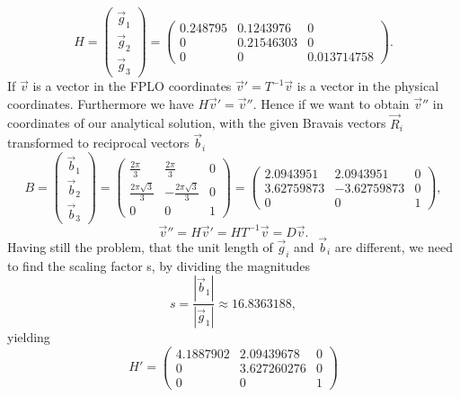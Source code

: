 		\begin{equation}
			H =
			\begin{pmatrix}
				\vec g_1 \\
				\vec g_2 \\
				\vec g_3			
			\end{pmatrix}	
			= 
			\begin{pmatrix}
				0.248795 & 0.1243976 & 0 \\
				0 & 0.21546303 & 0 \\
				0 & 0 & 0.013714758
			\end{pmatrix}.
		\end{equation}
		\newpage
		If $\vec v$ is a vector in the FPLO coordinates $\vec v' = T^{-1} \vec v$ is a vector in the physical coordinates. Furthermore we have $H \vec v' = \vec v''$. Hence if we want to obtain $\vec v''$ in coordinates of our analytical solution, with the given Bravais vectors $\vec R_i$ transformed to reciprocal vectors $\vec b_i$
		\begin{equation}
			B = 
			\begin{pmatrix}
				\vec b_1 \\
				\vec b_2 \\
				\vec b_3
			\end{pmatrix}
			=
			\begin{pmatrix}
				\frac{2\pi}{3} & \frac{2\pi}{3} & 0 \\
				\frac{2\pi\sqrt{3}}{3} & -\frac{2\pi \sqrt{3}}{3} & 0 \\
				0 & 0 & 1
			\end{pmatrix}
			= 
			\begin{pmatrix}
				2.0943951 & 2.0943951 & 0 \\
				3.62759873 & -3.62759873 & 0 \\
				0 & 0 & 1
			\end{pmatrix},
		\end{equation}
		\begin{equation}
			\vec v'' = H \vec v' = H T^{-1} \vec v = D \vec v.
		\end{equation}
		Having still the problem, that the unit length of $\vec g_i$ and $\vec b_i$ are different, we need to find the scaling factor s, by dividing the magnitudes 
		\begin{equation}
			s = \frac{|\vec b_1|}{|\vec g_1|} \approx 16.8363188,
		\end{equation}
		yielding
		\begin{equation}
			H' = 
			\begin{pmatrix}
				4.1887902 & 2.09439678 & 0 \\
				0 & 3.627260276 & 0 \\
				0 & 0 & 1
			\end{pmatrix}
		\end{equation}
